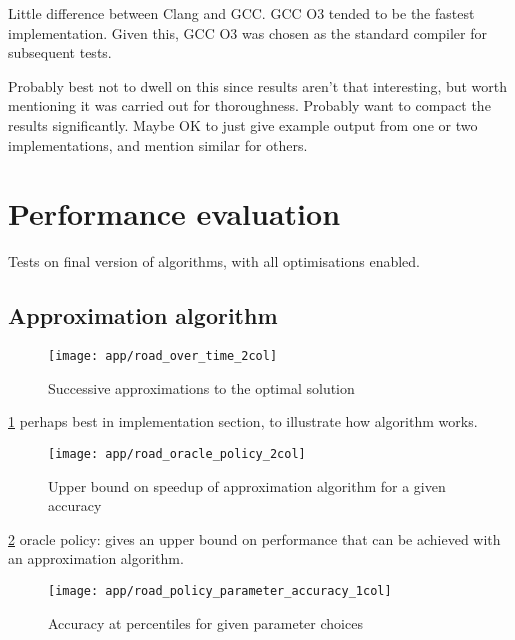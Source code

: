 Little difference between Clang and GCC. GCC O3 tended to be the fastest implementation. Given this, GCC O3 was chosen as the standard compiler for subsequent tests.

Probably best not to dwell on this since results aren't that interesting, but worth mentioning it was carried out for thoroughness. Probably want to compact the results significantly. Maybe OK to just give example output from one or two implementations, and mention similar for others.

\section{Performance evaluation}

Tests on final version of algorithms, with all optimisations enabled.

\subsection{Approximation algorithm} \label{sec:eval-approx}


\begin{figure}
    \centering
    \texttt{[image: app/road\_over\_time\_2col]}
    \caption{Successive approximations to the optimal solution}
    \label{fig:app-cost-over-time}
\end{figure}

\cref{fig:app-cost-over-time} perhaps best in implementation section, to illustrate how algorithm works.

\begin{figure}
    \centering
    \texttt{[image: app/road\_oracle\_policy\_2col]}
    \caption{Upper bound on speedup of approximation algorithm for a given accuracy}
    \label{fig:app-oracle-policy}
\end{figure}

\cref{fig:app-oracle-policy} oracle policy: gives an upper bound on performance that can be achieved with an approximation algorithm.

\begin{figure}
    \centering
    \texttt{[image: app/road\_policy\_parameter\_accuracy\_1col]}
    \caption{Accuracy at percentiles for given parameter choices}
    \label{fig:app-policy-parameter-accuracy}
\end{figure}

